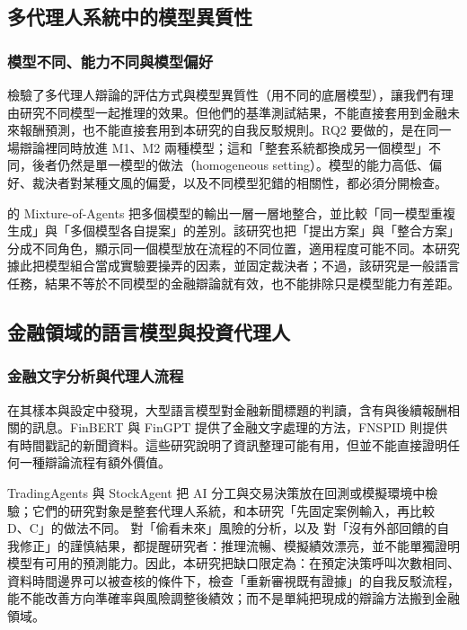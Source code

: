 \documentclass[12pt,a4paper]{article}
\numberwithin{table}{section}
\numberwithin{figure}{section}
\newcommand{\grp}[1]{\textsf{#1}}
\begin{document}
\subsection{多代理人系統中的模型異質性}

\subsubsection{模型不同、能力不同與模型偏好}

\citet{zhang2025stop} 檢驗了多代理人辯論的評估方式與模型異質性（用不同的底層模型），讓我們有理由研究不同模型一起推理的效果。但他們的基準測試結果，不能直接套用到金融未來報酬預測，也不能直接套用到本研究的自我反駁規則。RQ2 要做的，是在同一場辯論裡同時放進 M1、M2 兩種模型；這和「整套系統都換成另一個模型」不同，後者仍然是單一模型的做法（homogeneous setting）。模型的能力高低、偏好、裁決者對某種文風的偏愛，以及不同模型犯錯的相關性，都必須分開檢查。

\citet{wang2024moa} 的 Mixture-of-Agents 把多個模型的輸出一層一層地整合，並比較「同一模型重複生成」與「多個模型各自提案」的差別。該研究也把「提出方案」與「整合方案」分成不同角色，顯示同一個模型放在流程的不同位置，適用程度可能不同。本研究據此把模型組合當成實驗要操弄的因素，並固定裁決者；不過，該研究是一般語言任務，結果不等於不同模型的金融辯論就有效，也不能排除只是模型能力有差距。

\subsection{金融領域的語言模型與投資代理人}

\subsubsection{金融文字分析與代理人流程}
\citet{lopezlira2023chatgpt} 在其樣本與設定中發現，大型語言模型對金融新聞標題的判讀，含有與後續報酬相關的訊息。FinBERT \citep{araci2019finbert} 與 FinGPT \citep{liu2023fingpt} 提供了金融文字處理的方法，FNSPID \citep{dong2024fnspid} 則提供有時間戳記的新聞資料。這些研究說明了資訊整理可能有用，但並不能直接證明任何一種辯論流程有額外價值。

TradingAgents \citep{xiao2024tradingagents} 與 StockAgent \citep{zhang2024stockagent} 把 AI 分工與交易決策放在回測或模擬環境中檢驗；它們的研究對象是整套代理人系統，和本研究「先固定案例輸入，再比較 \grp{D}、\grp{C}」的做法不同。\citet{glasserman2023lookahead} 對「偷看未來」風險的分析，以及 \citet{huang2024selfcorrect} 對「沒有外部回饋的自我修正」的謹慎結果，都提醒研究者：推理流暢、模擬績效漂亮，並不能單獨證明模型有可用的預測能力。因此，本研究把缺口限定為：在預定決策呼叫次數相同、資料時間邊界可以被查核的條件下，檢查「重新審視既有證據」的自我反駁流程，能不能改善方向準確率與風險調整後績效；而不是單純把現成的辯論方法搬到金融領域。
\end{document}

